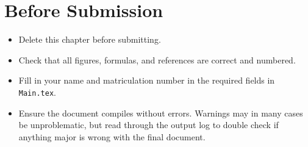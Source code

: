 \section*{Before Submission}
\begin{itemize}
    \item Delete this chapter before submitting.
    \item Check that all figures, formulas, and references are correct and numbered.
    \item Fill in your name and matriculation number in the required fields in \verb|Main.tex|.
    \item Ensure the document compiles without errors. Warnings may in many cases be unproblematic, but read through the output log to double check if anything major is wrong with the final document.
\end{itemize}



